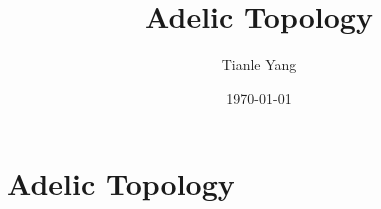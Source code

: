 \documentclass[sectionlevel=section,status=draft]{noteformyself}
\title{Adelic Topology}
\author{Tianle Yang}
\date{\today}
\begin{document}
    \maketitle

    \section[
      status=draft,
      tag=00000,
      label=\labelNFM{sec:p-adic-method:adelic-topology}
    ]{Adelic Topology}



    \printbibliography[heading=bibintoc, title={References}] %
\end{document}
